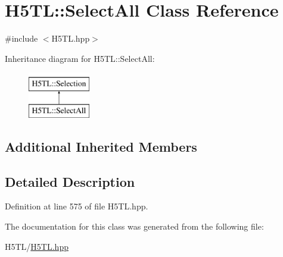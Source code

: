 \hypertarget{class_h5_t_l_1_1_select_all}{\section{H5\-T\-L\-:\-:Select\-All Class Reference}
\label{class_h5_t_l_1_1_select_all}
}


{\ttfamily \#include $<$H5\-T\-L.\-hpp$>$}

Inheritance diagram for H5\-T\-L\-:\-:Select\-All\-:\begin{figure}[H]
\begin{center}
\leavevmode
\includegraphics[height=2.000000cm]{class_h5_t_l_1_1_select_all}
\end{center}
\end{figure}
\subsection*{Additional Inherited Members}


\subsection{Detailed Description}


Definition at line 575 of file H5\-T\-L.\-hpp.



The documentation for this class was generated from the following file\-:\begin{DoxyCompactItemize}
\item 
H5\-T\-L/\hyperlink{_h5_t_l_8hpp}{H5\-T\-L.\-hpp}\end{DoxyCompactItemize}
